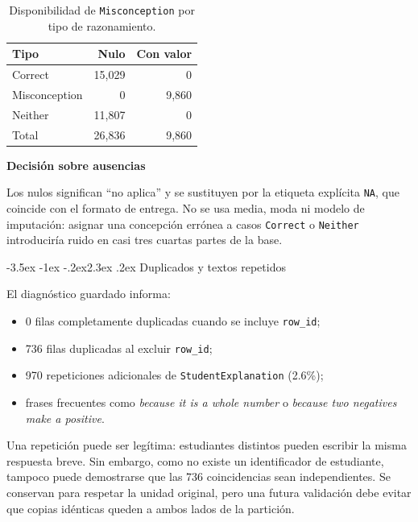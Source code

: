 \documentclass[11pt,oneside,openany]{book}
\makeatletter
\renewcommand\section{\@startsection{section}{1}{\z@}%
  {-3.5ex \@plus -1ex \@minus -.2ex}{2.3ex \@plus .2ex}%
  {\normalfont\Large\sffamily\bfseries\color{AzulMedio}}}
\newenvironment{decision}[1][]{%
  \begin{lrbox}{\infobox}\begin{minipage}{0.92\textwidth}
  \color{GrisTexto}\sffamily\textbf{#1}\par\smallskip\rmfamily}
  {\end{minipage}\end{lrbox}\par\medskip\noindent
   \colorbox{VerdeClaro}{\usebox{\infobox}}\par\medskip}
\newcommand{\codigo}[1]{\texttt{#1}}
\makeatother
\begin{document}
\begin{table}[htbp]
\centering
\caption{Disponibilidad de \codigo{Misconception} por tipo de razonamiento.}
\label{tab:nulos}
\begin{tabular}{@{}lrr@{}}
\toprule
\textbf{Tipo} & \textbf{Nulo} & \textbf{Con valor}\\
\midrule
Correct & 15,029 & 0\\
Misconception & 0 & 9,860\\
Neither & 11,807 & 0\\
\midrule
Total & 26,836 & 9,860\\
\bottomrule
\end{tabular}
\end{table}

\begin{decision}[Decisión sobre ausencias]
Los nulos significan ``no aplica'' y se sustituyen por la etiqueta explícita
\codigo{NA}, que coincide con el formato de entrega. No se usa media, moda ni
modelo de imputación: asignar una concepción errónea a casos \codigo{Correct} o
\codigo{Neither} introduciría ruido en casi tres cuartas partes de la base.
\end{decision}

\section{Duplicados y textos repetidos}

El diagnóstico guardado informa:

\begin{itemize}
  \item 0 filas completamente duplicadas cuando se incluye \codigo{row\_id};
  \item 736 filas duplicadas al excluir \codigo{row\_id};
  \item 970 repeticiones adicionales de \codigo{StudentExplanation} (2.6\%);
  \item frases frecuentes como \emph{because it is a whole number} o
        \emph{because two negatives make a positive}.
\end{itemize}

Una repetición puede ser legítima: estudiantes distintos pueden escribir la
misma respuesta breve. Sin embargo, como no existe un identificador de
estudiante, tampoco puede demostrarse que las 736 coincidencias sean
independientes. Se conservan para respetar la unidad original, pero una futura
validación debe evitar que copias idénticas queden a ambos lados de la
partición.
\end{document}
